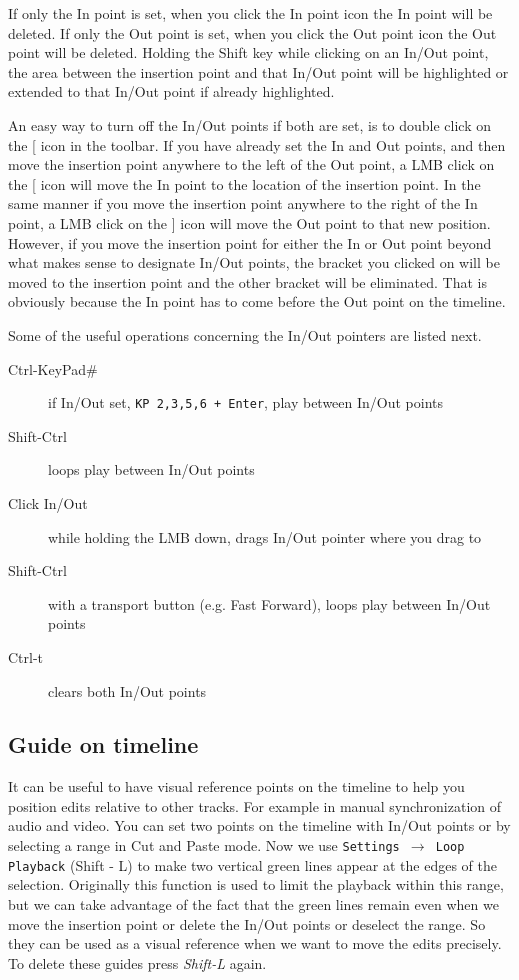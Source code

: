 If only the In point is set, when you click the In point icon the In point will be deleted. 
If only the Out point is set, when you click the Out point icon the Out point will be deleted. 
Holding the Shift key while clicking on an In/Out point, the area between the insertion point and that
In/Out point will be highlighted or extended to that In/Out point if already highlighted. 

An easy way to turn off the In/Out points if both are set, is to double click on the [ icon in the toolbar. 
If you have already set the In and Out points, and then move the insertion point anywhere to the left of
the Out point, a LMB click on the [ icon will move the In point to the location of the insertion point.  In the same
manner if you move the insertion point anywhere to the right of the In point, a LMB click on the ] icon
will move the Out point to that new position.  However, if you move the insertion point for either the
In or Out point beyond what makes sense to designate In/Out points, the bracket you clicked on will be
moved to the insertion point and the other bracket will be eliminated.  That is obviously because the
In point has to come before the Out point on the timeline.

Some of the useful operations concerning the In/Out pointers are listed next.

\begin{description}
    \item[Ctrl-KeyPad\#]  if In/Out set, \texttt{KP 2,3,5,6 + Enter}, play between In/Out points
    \item[Shift-Ctrl]  loops play between In/Out points
    \item[Click In/Out] while holding the LMB down, drags In/Out pointer where you drag to
    \item[Shift-Ctrl] with a transport button (e.g. Fast Forward), loops play between In/Out points
    \item[Ctrl-t]  clears both In/Out points
\end{description}

\subsection{Guide on timeline}%
\label{sub:guide_timeline}

It can be useful to have visual reference points on the timeline to help you position edits relative to other tracks. For example in manual synchronization of audio and video. You can set two points on the timeline with In/Out points or by selecting a range in Cut and Paste mode. Now we use \texttt{Settings $\rightarrow$ Loop Playback} (Shift - L) to make two vertical green lines appear at the edges of the selection. Originally this function is used to limit the playback within this range, but we can take advantage of the fact that the green lines remain even when we move the insertion point or delete the In/Out points or deselect the range. So they can be used as a visual reference when we want to move the edits precisely. To delete these guides press \textit{Shift-L} again.


